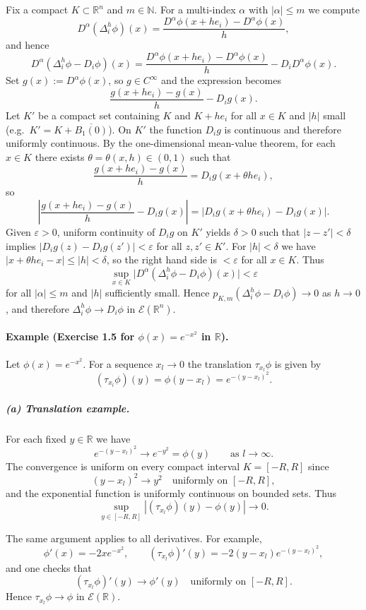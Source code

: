 \documentclass[12pt,a4paper]{article}
\theoremstyle{plain}
\theoremstyle{definition}
\theoremstyle{remark}
\theoremstyle{remark}
\begin{document}
Fix a compact $K\subset\mathbb{R}^n$ and $m\in\mathbb{N}$.  For a
multi-index $\alpha$ with $|\alpha|\le m$ we compute
\[
D^\alpha(\Delta_i^h\phi)(x)
= \frac{D^\alpha\phi(x+he_i) - D^\alpha\phi(x)}{h},
\]
and hence
\[
D^\alpha(\Delta_i^h\phi - D_i\phi)(x)
= \frac{D^\alpha\phi(x+he_i) - D^\alpha\phi(x)}{h}
- D_i D^\alpha\phi(x).
\]
Set $g(x) := D^\alpha\phi(x)$, so $g\in C^\infty$ and the expression
becomes
\[
\frac{g(x+he_i) - g(x)}{h} - D_i g(x).
\]
Let $K'$ be a compact set containing $K$ and $K+he_i$ for all $x\in K$
and $|h|$ small (e.g.\ $K' = K + \overline{B_1(0)}$).  On $K'$ the
function $D_i g$ is continuous and therefore uniformly continuous.
By the one-dimensional mean-value theorem, for each $x\in K$ there
exists $\theta=\theta(x,h)\in(0,1)$ such that
\[
\frac{g(x+he_i) - g(x)}{h}
= D_i g(x + \theta h e_i),
\]
so
\[
\left|
\frac{g(x+he_i) - g(x)}{h} - D_i g(x)
\right|
= |D_i g(x+\theta h e_i) - D_i g(x)|.
\]
Given $\varepsilon>0$, uniform continuity of $D_i g$ on $K'$ yields
$\delta>0$ such that $|z-z'|<\delta$ implies
$|D_i g(z)-D_i g(z')|<\varepsilon$ for all $z,z'\in K'$.  For
$|h|<\delta$ we have $|x+\theta h e_i - x| \le |h|<\delta$, so the right
hand side is $<\varepsilon$ for all $x\in K$.  Thus
\[
\sup_{x\in K} \bigl| D^\alpha(\Delta_i^h\phi - D_i\phi)(x) \bigr|
< \varepsilon
\]
for all $|\alpha|\le m$ and $|h|$ sufficiently small.  Hence
$p_{K,m}(\Delta_i^h\phi - D_i\phi)\to 0$ as $h\to 0$, and therefore
$\Delta_i^h\phi \to D_i\phi$ in $\mathcal{E}(\mathbb{R}^n)$.


\paragraph{Example (Exercise 1.5 for $\phi(x)=e^{-x^2}$ in $\mathbb{R}$).}

Let $\phi(x)=e^{-x^2}$.  
For a sequence $x_l\to 0$ the translation
$\tau_{x_l}\phi$ is given by
\[
(\tau_{x_l}\phi)(y)
= \phi(y-x_l)
= e^{-(y-x_l)^2}.
\]

\subparagraph*{(a) Translation example.}

For each fixed $y\in\mathbb{R}$ we have
\[
e^{-(y-x_l)^2} \longrightarrow e^{-y^2} = \phi(y)
\qquad \text{as } l\to\infty.
\]
The convergence is uniform on every compact interval $K=[-R,R]$ since
\[
(y-x_l)^2 \to y^2
\quad\text{uniformly on } [-R,R],
\]
and the exponential function is uniformly continuous on bounded sets.
Thus
\[
\sup_{y\in[-R,R]}
\left| (\tau_{x_l}\phi)(y) - \phi(y) \right| \to 0.
\]

The same argument applies to all derivatives.  For example,
\[
\phi'(x) = -2x e^{-x^2},
\qquad
(\tau_{x_l}\phi)'(y)
= -2(y-x_l)e^{-(y-x_l)^2},
\]
and one checks that
\[
(\tau_{x_l}\phi)'(y)
\longrightarrow \phi'(y)
\quad \text{uniformly on } [-R,R].
\]
Hence $\tau_{x_l}\phi\to \phi$ in $\mathcal{E}(\mathbb{R})$.
\end{document}

